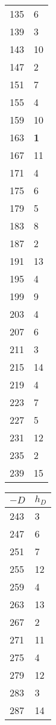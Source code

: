 \documentclass[11pt]{report}
\begin{document}
\begin{center}
\begin{tabular}{|ll|}
    135  & 6       \\
    139  & 3       \\
    143  & 10      \\
    147  & 2       \\
    151  & 7       \\
    155  & 4       \\
    159  & 10      \\
    163  & {\bf 1} \\
    167  & 11      \\
    171  & 4       \\
    175  & 6       \\
    179  & 5       \\
    183  & 8       \\
    187  & 2       \\
    191  & 13      \\
    195  & 4       \\
    199  & 9       \\
    203  & 4       \\
    207  & 6       \\
    211  & 3       \\
    215  & 14      \\
    219  & 4       \\
    223  & 7       \\
    227  & 5       \\
    231  & 12      \\
    235  & 2       \\
    239  & 15      \\\hline
  \end{tabular}
  \begin{tabular}{|ll|}\hline
    $-D$ & $h_{D}$ \\\hline
    243  & 3       \\
    247  & 6       \\
    251  & 7       \\
    255  & 12      \\
    259  & 4       \\
    263  & 13      \\
    267  & 2       \\
    271  & 11      \\
    275  & 4       \\
    279  & 12      \\
    283  & 3       \\
    287  & 14      \\

\end{tabular}
\end{center}
\end{document}
